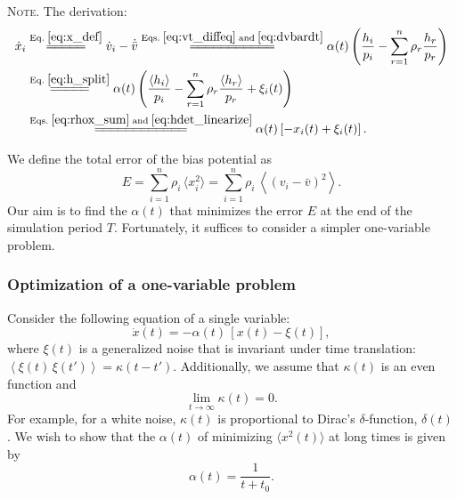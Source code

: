 \documentclass[reprint, floatfix]{revtex4-1}
\newcommand{\note}[1]{{\color{DarkGreen}\footnotesize \textsc{Note.} #1}}
\newcommand{\Err}{E}
\begin{document}
\note{The derivation:
$$
\begin{aligned}
  \dot x_i
  &\stackrel{\mathrm{Eq.\; \eqref{eq:x_def}}}
            {=\joinrel=\joinrel=\joinrel=\joinrel=}
  \dot v_i - \dot{ \bar v }
  \stackrel{\mathrm{Eqs.\; \eqref{eq:vt_diffeq}\; and\; \eqref{eq:dvbardt}}}
            {=\joinrel=\joinrel=\joinrel=\joinrel=\joinrel=\joinrel=\joinrel=\joinrel=\joinrel=\joinrel=}
  \alpha(t) \left(
    \frac{ h_i } { p_i }
    -
    \sum_{ r = 1 }^n
      \rho_r \frac{ h_r } { p_r }
  \right)
  \\
  &\stackrel{\mathrm{Eq.\; \eqref{eq:h_split}}}
            {=\joinrel=\joinrel=\joinrel=\joinrel=}
  \alpha(t) \left(
    \frac{ \langle h_i \rangle } { p_i }
    -
    \sum_{ r = 1 }^n
      \rho_r \frac{ \langle h_r \rangle } { p_r }
    +
    \xi_i(t)
  \right)
  \\
  &\stackrel{\mathrm{Eqs.\; \eqref{eq:rhox_sum} \;and\; \eqref{eq:hdet_linearize}}}
            {=\joinrel=\joinrel=\joinrel=\joinrel=\joinrel=\joinrel=\joinrel=\joinrel=\joinrel=\joinrel=\joinrel=}
  \alpha(t) \left[ -x_i(t) + \xi_i(t) \right].
\end{aligned}
$$
}


We define
the total error of the bias potential as
\begin{equation}
  \Err
  =
  \sum_{i = 1}^n \rho_i \, \langle x_i^2 \rangle
  =
  \sum_{i = 1}^n \rho_i \, \left\langle (v_i - \bar v)^2 \right\rangle
  .
\label{eq:error_sum}
\end{equation}
%
Our aim is to find the $\alpha(t)$
that minimizes the error $E$
at the end of the simulation period $T$.
%
Fortunately, it suffices to consider
a simpler one-variable problem.



\subsubsection{Optimization of a one-variable problem}



Consider the following equation
of a single variable:
%
\begin{equation}
\dot x(t) = -\alpha(t) \, \left[ x(t) - \xi(t) \right],
\label{eq:dxdt_alpha}
\end{equation}
%
where $\xi(t)$ is a generalized noise
that is invariant under time translation:
%
$
  \left\langle \xi(t) \, \xi(t') \right\rangle
  =
  \kappa(t - t')
  .
$
%
Additionally,
we assume that $\kappa(t)$ is an even function and
\begin{equation}
  \lim_{t \rightarrow \infty} \kappa(t)
  = 0
  .
  \label{eq:kappa_limit}
\end{equation}
%
For example, for a white noise,
$\kappa(t)$ is proportional to
Dirac's $\delta$-function, $\delta(t)$.
%
We wish to show that the $\alpha(t)$
of minimizing $\langle x^2(t) \rangle$ at long times
is given by
%
\begin{equation}
  \alpha(t) = \frac{ 1 }{ t + t_0 }.
\label{eq:alpha_invt1}
\end{equation}
\end{document}
